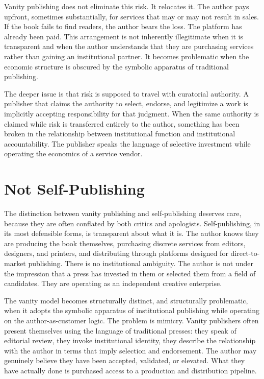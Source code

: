 \documentclass[12pt, a4paper]{article}
\begin{document}
Vanity publishing does not eliminate this risk. It relocates it. The author pays upfront, sometimes substantially, for services that may or may not result in sales. If the book fails to find readers, the author bears the loss. The platform has already been paid. This arrangement is not inherently illegitimate when it is transparent and when the author understands that they are purchasing services rather than gaining an institutional partner. It becomes problematic when the economic structure is obscured by the symbolic apparatus of traditional publishing.

The deeper issue is that risk is supposed to travel with curatorial authority. A publisher that claims the authority to select, endorse, and legitimize a work is implicitly accepting responsibility for that judgment. When the same authority is claimed while risk is transferred entirely to the author, something has been broken in the relationship between institutional function and institutional accountability. The publisher speaks the language of selective investment while operating the economics of a service vendor.

\section{Not Self-Publishing}

The distinction between vanity publishing and self-publishing deserves care, because they are often conflated by both critics and apologists. Self-publishing, in its most defensible forms, is transparent about what it is. The author knows they are producing the book themselves, purchasing discrete services from editors, designers, and printers, and distributing through platforms designed for direct-to-market publishing. There is no institutional ambiguity. The author is not under the impression that a press has invested in them or selected them from a field of candidates. They are operating as an independent creative enterprise.

The vanity model becomes structurally distinct, and structurally problematic, when it adopts the symbolic apparatus of institutional publishing while operating on the author-as-customer logic. The problem is mimicry. Vanity publishers often present themselves using the language of traditional presses: they speak of editorial review, they invoke institutional identity, they describe the relationship with the author in terms that imply selection and endorsement. The author may genuinely believe they have been accepted, validated, or elevated. What they have actually done is purchased access to a production and distribution pipeline.
\end{document}
